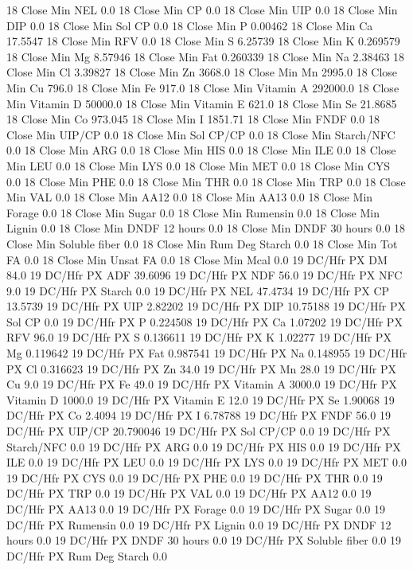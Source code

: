 \documentclass[letterpaper,10pt,english]{sphinxmanual}
\begin{document}
\begin{sphinxVerbatim}[commandchars=\\\{\},numbers=left,firstnumber=1,stepnumber=1]
18 Close Min NEL 0.0
18 Close Min CP 0.0
18 Close Min UIP 0.0
18 Close Min DIP 0.0
18 Close Min Sol CP 0.0
18 Close Min P 0.00462
18 Close Min Ca 17.5547
18 Close Min RFV 0.0
18 Close Min S 6.25739
18 Close Min K 0.269579
18 Close Min Mg 8.57946
18 Close Min Fat 0.260339
18 Close Min Na 2.38463
18 Close Min Cl 3.39827
18 Close Min Zn 3668.0
18 Close Min Mn 2995.0
18 Close Min Cu 796.0
18 Close Min Fe 917.0
18 Close Min Vitamin A 292000.0
18 Close Min Vitamin D 50000.0
18 Close Min Vitamin E 621.0
18 Close Min Se 21.8685
18 Close Min Co 973.045
18 Close Min I 1851.71
18 Close Min FNDF 0.0
18 Close Min UIP/CP 0.0
18 Close Min Sol CP/CP 0.0
18 Close Min Starch/NFC 0.0
18 Close Min ARG 0.0
18 Close Min HIS 0.0
18 Close Min ILE 0.0
18 Close Min LEU 0.0
18 Close Min LYS 0.0
18 Close Min MET 0.0
18 Close Min CYS 0.0
18 Close Min PHE 0.0
18 Close Min THR 0.0
18 Close Min TRP 0.0
18 Close Min VAL 0.0
18 Close Min AA\PYGZsh{}12 0.0
18 Close Min AA\PYGZsh{}13 0.0
18 Close Min \PYGZpc{} Forage 0.0
18 Close Min Sugar \PYGZpc{} 0.0
18 Close Min Rumensin 0.0
18 Close Min Lignin 0.0
18 Close Min DNDF 12 hours 0.0
18 Close Min DNDF 30 hours 0.0
18 Close Min Soluble fiber 0.0
18 Close Min Rum Deg Starch 0.0
18 Close Min Tot FA 0.0
18 Close Min Unsat FA 0.0
18 Close Min Mcal 0.0
19 DC/Hfr PX DM 84.0
19 DC/Hfr PX ADF 39.6096
19 DC/Hfr PX NDF 56.0
19 DC/Hfr PX NFC 9.0
19 DC/Hfr PX Starch 0.0
19 DC/Hfr PX NEL 47.4734
19 DC/Hfr PX CP 13.5739
19 DC/Hfr PX UIP 2.82202
19 DC/Hfr PX DIP 10.75188
19 DC/Hfr PX Sol CP 0.0
19 DC/Hfr PX P 0.224508
19 DC/Hfr PX Ca 1.07202
19 DC/Hfr PX RFV 96.0
19 DC/Hfr PX S 0.136611
19 DC/Hfr PX K 1.02277
19 DC/Hfr PX Mg 0.119642
19 DC/Hfr PX Fat 0.987541
19 DC/Hfr PX Na 0.148955
19 DC/Hfr PX Cl 0.316623
19 DC/Hfr PX Zn 34.0
19 DC/Hfr PX Mn 28.0
19 DC/Hfr PX Cu 9.0
19 DC/Hfr PX Fe 49.0
19 DC/Hfr PX Vitamin A 3000.0
19 DC/Hfr PX Vitamin D 1000.0
19 DC/Hfr PX Vitamin E 12.0
19 DC/Hfr PX Se 1.90068
19 DC/Hfr PX Co 2.4094
19 DC/Hfr PX I 6.78788
19 DC/Hfr PX FNDF 56.0
19 DC/Hfr PX UIP/CP 20.790046
19 DC/Hfr PX Sol CP/CP 0.0
19 DC/Hfr PX Starch/NFC 0.0
19 DC/Hfr PX ARG 0.0
19 DC/Hfr PX HIS 0.0
19 DC/Hfr PX ILE 0.0
19 DC/Hfr PX LEU 0.0
19 DC/Hfr PX LYS 0.0
19 DC/Hfr PX MET 0.0
19 DC/Hfr PX CYS 0.0
19 DC/Hfr PX PHE 0.0
19 DC/Hfr PX THR 0.0
19 DC/Hfr PX TRP 0.0
19 DC/Hfr PX VAL 0.0
19 DC/Hfr PX AA\PYGZsh{}12 0.0
19 DC/Hfr PX AA\PYGZsh{}13 0.0
19 DC/Hfr PX \PYGZpc{} Forage 0.0
19 DC/Hfr PX Sugar \PYGZpc{} 0.0
19 DC/Hfr PX Rumensin 0.0
19 DC/Hfr PX Lignin 0.0
19 DC/Hfr PX DNDF 12 hours 0.0
19 DC/Hfr PX DNDF 30 hours 0.0
19 DC/Hfr PX Soluble fiber 0.0
19 DC/Hfr PX Rum Deg Starch 0.0

\end{sphinxVerbatim}
\end{document}

